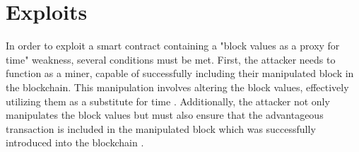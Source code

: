 \section{Exploits}
In order to exploit a smart contract containing a "block values as a proxy for time" weakness,
several conditions must be met. First, the attacker needs to function as a miner, capable of successfully
including their manipulated block in the blockchain. This manipulation involves altering the block values, effectively
utilizing them as a substitute for time \cite{swc116}.
Additionally, the attacker not only manipulates the block values but must also ensure that the advantageous transaction is included 
in the manipulated block which was successfully introduced into the blockchain \cite{cryptomarket}.